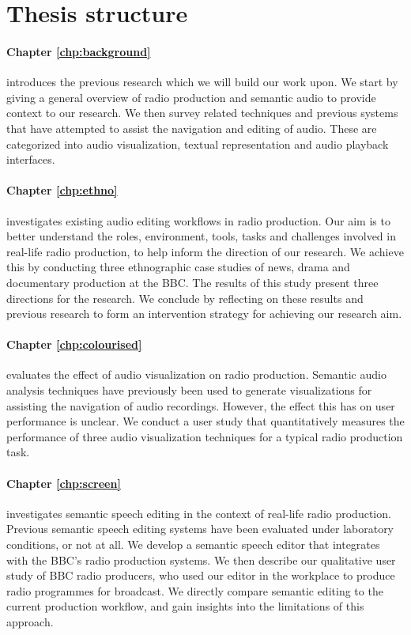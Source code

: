 \section{Thesis structure}\label{sec:intro/structure}

\paragraph{Chapter \ref{chp:background}} introduces the previous research which we will build our work upon. We start
by giving a general overview of radio production and semantic audio to provide context to our research. We then survey
related techniques and previous systems that have attempted to assist the navigation and editing of audio. These are
categorized into audio visualization, textual representation and audio playback interfaces.

\paragraph{Chapter \ref{chp:ethno}} investigates existing audio editing workflows in radio production. Our aim is to
better understand the roles, environment, tools, tasks and challenges involved in real-life radio production, to help
inform the direction of our research.  We achieve this by conducting three ethnographic case studies of news, drama and
documentary production at the BBC.  The results of this study present three directions for the research.  We conclude
by reflecting on these results and previous research to form an intervention strategy for achieving our research aim.

\paragraph{Chapter \ref{chp:colourised}} evaluates the effect of audio visualization on radio production.  Semantic
audio analysis techniques have previously been used to generate visualizations for assisting the navigation of audio
recordings. However, the effect this has on user performance is unclear.  We conduct a user study that quantitatively
measures the performance of three audio visualization techniques for a typical radio production task.

\paragraph{Chapter \ref{chp:screen}} investigates semantic speech editing in the context of real-life radio production.
Previous semantic speech editing systems have been evaluated under laboratory conditions, or not at all.  We develop a 
semantic speech editor that integrates with the BBC's radio production systems.  We then describe our qualitative
user study of BBC radio producers, who used our editor in the workplace to produce radio programmes for broadcast.  We
directly compare semantic editing to the current production workflow, and gain insights into the limitations of this
approach.

